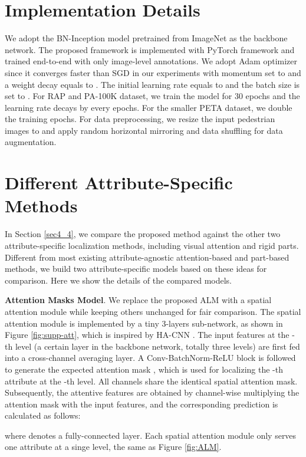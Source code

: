 \documentclass[10pt,twocolumn,letterpaper]{article}
\begin{document}
\section{Implementation Details} \label{appendix_a}
We adopt the BN-Inception model pretrained from ImageNet as the backbone network.
The proposed framework is implemented with PyTorch framework and trained end-to-end with only image-level annotations.
We adopt Adam optimizer since it converges faster than SGD in our experiments with momentum set to  and a weight decay equals to .
The initial learning rate equals to  and the batch size is set to .
For RAP and PA-100K dataset, we train the model for 30 epochs and the learning rate decays by  every  epochs.
For the smaller PETA dataset, we double the training epochs.
For data preprocessing, we resize the input pedestrian images to  and apply random horizontal mirroring and data shuffling for data augmentation.

\section{Different Attribute-Specific Methods} \label{appendix_b}
In Section \ref{sec4_4}, we compare the proposed method against the other two attribute-specific localization methods, including visual attention and rigid parts.
Different from most existing attribute-agnostic attention-based and part-based methods, we build two attribute-specific models based on these ideas for comparison.
Here we show the details of the compared models.

\textbf{Attention Masks Model}. We replace the proposed ALM with a spatial attention module while keeping others unchanged for fair comparison.
The spatial attention module is implemented by a tiny 3-layers sub-network, as shown in Figure \ref{fig:supp-att}, which is inspired by HA-CNN \cite{li2018harmonious}.
The input features  at the -th level (a certain layer in the backbone network, totally three levels) are first fed into a cross-channel averaging layer.
A  Conv-BatchNorm-ReLU block is followed to generate the expected attention mask , which is used for localizing the -th attribute at the -th level.
All channels share the identical spatial attention mask.
Subsequently, the attentive features are obtained by channel-wise multiplying the attention mask with the input features,
and the corresponding prediction is calculated as follows:

where  denotes a fully-connected layer.
Each spatial attention module only serves one attribute at a singe level, the same as Figure \ref{fig:ALM}.
\end{document}
